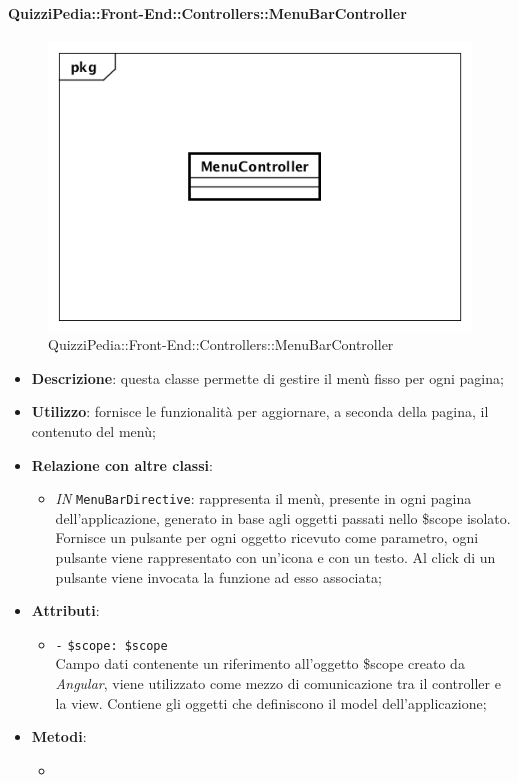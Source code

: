 \paragraph{QuizziPedia::Front-End::Controllers::MenuBarController}
\begin{figure}
	\centering
	\includegraphics[scale=0.45]{UML/Classi/Front-End/QuizziPedia_Front-end_Controller_MenuBarController.png}
	\caption{QuizziPedia::Front-End::Controllers::MenuBarController}
\end{figure}
\begin{itemize}
	\item \textbf{Descrizione}: questa classe permette di gestire il menù fisso per ogni pagina;
	\item \textbf{Utilizzo}: fornisce le funzionalità per aggiornare, a seconda della pagina, il contenuto del menù;
	\item \textbf{Relazione con altre classi}:
	\begin{itemize}
		\item \textit{IN} \texttt{MenuBarDirective}: rappresenta il menù, presente in ogni pagina dell'applicazione, generato in base agli oggetti passati nello \$scope isolato. Fornisce un pulsante per ogni oggetto ricevuto come parametro, ogni pulsante viene rappresentato con un’icona e con un testo. Al click di un pulsante viene invocata la funzione ad esso associata;  
	\end{itemize}
	\item \textbf{Attributi}:
	\begin{itemize}
		\item \texttt{-} \texttt{\$scope: \$scope} \\
		Campo dati contenente un riferimento all’oggetto \$scope creato da \textit{Angular}, viene utilizzato come mezzo di comunicazione tra il controller e la view. Contiene gli oggetti che definiscono il model dell’applicazione;
	\end{itemize}
	\item \textbf{Metodi}:
	\begin{itemize}
		\item 
	\end{itemize}
\end{itemize}


